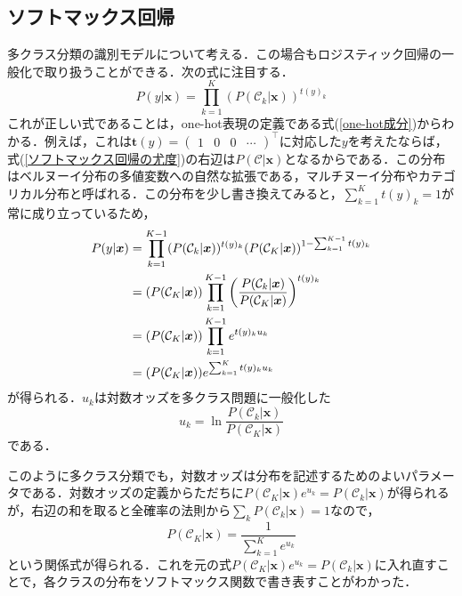 \documentclass[a4paper,11pt]{jsreport}
\begin{document}
\subsection{ソフトマックス回帰}
多クラス分類の識別モデルについて考える．この場合もロジスティック回帰の一般化で取り扱うことができる．次の式に注目する．
\begin{equation}
  P(y | \bm{x}) 
  = \prod_{k=1}^{K} (P(\mathcal{C}_k | \bm{x}))^{t(y)_k}
  \label{ソフトマックス回帰の尤度}
\end{equation}
これが正しい式であることは，one-hot表現の定義である式(\ref{one-hot成分})からわかる．例えば，これは$\bm{t}(y) = \begin{pmatrix} 1 & 0 & 0 & \cdots \end{pmatrix}^{\top}$に対応した$y$を考えたならば，式(\ref{ソフトマックス回帰の尤度})の右辺は$P(\mathcal{C} | \bm{x})$となるからである．この分布はベルヌーイ分布の多値変数への自然な拡張である，マルチヌーイ分布やカテゴリカル分布と呼ばれる．この分布を少し書き換えてみると，$\sum_{k=1}^{K} t(y)_k = 1$が常に成り立っているため，
\begin{align}
  P(y | \bm{x}) 
  &= \prod_{k=1}^{K-1} (P(\mathcal{C}_k | \bm{x}))^{t(y)_k} (P(\mathcal{C}_K | \bm{x}))^{1 - \sum_{k=1}^{K-1} t(y)_k} \notag \\
  &= (P(\mathcal{C}_K | \bm{x})) \prod_{k=1}^{K-1} \left( \frac{P(\mathcal{C}_k | \bm{x})}{P(\mathcal{C}_K | \bm{x})} \right)^{t(y)_k} \notag \\
  &= (P(\mathcal{C}_K | \bm{x})) \prod_{k=1}^{K-1} e^{t(y)_k u_k} \notag \\
  &= (P(\mathcal{C}_K | \bm{x})) e^{\sum_{k=1}^{K} t(y)_k u_k} 
\end{align}
が得られる．$u_k$は対数オッズを多クラス問題に一般化した
\begin{equation}
  u_k = \ln{\frac{P(\mathcal{C}_k | \bm{x})}{P(\mathcal{C}_K | \bm{x})}}
\end{equation}
である．\par
このように多クラス分類でも，対数オッズは分布を記述するためのよいパラメータである．対数オッズの定義からただちに$P(\mathcal{C}_K | \bm{x}) e^{u_k} = P(\mathcal{C}_k | \bm{x})$が得られるが，右辺の和を取ると全確率の法則から$\sum_{k} P(\mathcal{C}_k | \bm{x}) = 1$なので，
\begin{equation}
  P(\mathcal{C}_K | \bm{x})
  = \frac{1}{\sum_{k=1}^{K} e^{u_k}}
\end{equation}
という関係式が得られる．これを元の式$P(\mathcal{C}_K | \bm{x}) e^{u_k} = P(\mathcal{C}_k | \bm{x})$に入れ直すことで，各クラスの分布をソフトマックス関数で書き表すことがわかった．
\end{document}
